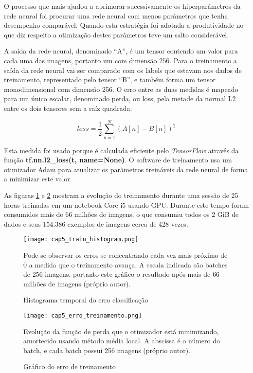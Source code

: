 O processo que mais ajudou a aprimorar sucessivamente os hiperparâmetros da
rede neural foi procurar uma rede neural com menos parâmetros que tenha
desempenho comparável. Quando esta estratégia foi adotada a produtividade no
que diz respeito a otimização destes parâmetros teve um salto considerável.

A saída da rede neural, denominado “A”, é um tensor contendo um valor para cada
uma das imagens, portanto um com dimensão 256. Para o treinamento a saída da
rede neural vai ser comparado com os labels que estavam nos dados de
treinamento, representado pelo tensor “B”, e também forma um tensor
monodimensional com dimensão 256. O erro entre as duas medidas é mapeado para
um único escalar, denominado perda, ou loss, pela metade da normal L2 entre os
dois tensores sem a raíz quadrada:

\begin{equation}
	loss=\frac{1}{2} \sum_{n=1}^N \left( A[n] - B[n] \right)^2
\end{equation}

Esta medida foi usado porque é calculada eficiente pelo \emph{TensorFlow}
através da função \textbf{tf.nn.l2\_loss(t, name=None)}. O software de
treinamento usa um otimizador
Adam \cite{kingma2014adam} para atualizar os parâmetros treináveis da rede
neural de forma a minimizar este valor.

As figuras \ref{fig:cap5_train_histogram} e \ref{fig:cap5_erro_treinamento}
mostram a evolução do treinamento durante uma sessão de 25
horas treinadas em um notebook Core i5 usando GPU. Durante este tempo foram
consumidos mais de 66 milhões de imagens, o que consumiu todos os 2 GiB de
dados e seus 154.386 exemplos de imagens cerca de 428 vezes.

\begin{figure}[!htb]
	\centering
	\texttt{[image: cap5\_train\_histogram.png]}
	\caption{Histograma temporal do erro classificação}
	\label{fig:cap5_train_histogram}
	Pode-se observar os erros se concentrando cada vez mais próximo de 0 a
	medida que o treinamento avança. A escala indicada são batches de 256
	imagens, portanto este gráfico o resultado após mais de 66 milhões de
	imagens (próprio autor).
\end{figure}

\begin{figure}[!htb]
	\centering
	\texttt{[image: cap5\_erro\_treinamento.png]}
	\caption{Gráfico do erro de treinamento}
	\label{fig:cap5_erro_treinamento}
	Evolução da função de perda que o otimizador está minimizando, amortecido
	usando método média local. A abscissa é o número do batch, e cada batch
	possui 256 imagens (próprio autor).
\end{figure}

